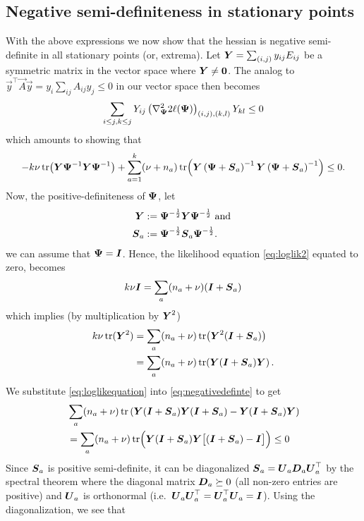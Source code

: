 \documentclass{article}\usepackage[]{graphicx}\usepackage[]{color}
\begin{document}
\subsection{Negative semi-definiteness in stationary points}
With the above expressions we now show that the hessian is negative semi-definite in all stationary points (or, extrema).
Let ${\boldsymbol{Y}} = \sum_{(i,j)} y_{ij}E_{ij}$ be a symmetric matrix in the vector space where ${\boldsymbol{Y}} \neq \boldsymbol{0}$. The analog to $\vec{y}^\top \vec{A}\vec{y} = y_i \sum_{ij} A_{ij} y_j \leq 0$ in our vector space then becomes
\begin{align*}
  \sum_{i\leq j, k\leq j}
    Y_{ij}
    \left(\nabla^2_{\boldsymbol{\Psi}} 2\ell({\boldsymbol{\Psi}})\right)_{(i,j),(k,l)}
    Y_{kl} \leq 0
\end{align*}
which amounts to showing that
\small
\begin{align}
- k\nu\operatorname*{tr}\!\left( {\boldsymbol{Y}}{\boldsymbol{\Psi}}^{-1} {\boldsymbol{Y}}{\boldsymbol{\Psi}}^{-1} \right)
+ \sum_{a = 1}^k (\nu + n_a)
    \operatorname*{tr}\!\left(
      {\boldsymbol{Y}}\left({\boldsymbol{\Psi}} + {\boldsymbol{S}}_a\right)^{-1}
      {\boldsymbol{Y}}\left({\boldsymbol{\Psi}} + {\boldsymbol{S}}_a\right)^{-1}
    \right) \leq 0.
  \label{eq:negativedefinte}
\end{align}
\normalsize
Now, the positive-definiteness of ${\boldsymbol{\Psi}}$, let
\begin{align*}
  {\boldsymbol{Y}} &:= {\boldsymbol{\Psi}}^{-\frac{1}{2}} {\boldsymbol{Y}} {\boldsymbol{\Psi}}^{-\frac{1}{2}} \text{ and } \\
  {\boldsymbol{S}}_a &:= {\boldsymbol{\Psi}}^{-\frac{1}{2}} {\boldsymbol{S}}_a  {\boldsymbol{\Psi}}^{-\frac{1}{2}}.
\end{align*}
we can assume that ${\boldsymbol{\Psi}} = {\boldsymbol{I}}$. Hence, the likelihood equation \eqref{eq:loglik2} equated to zero, becomes
\begin{align*}
  k\nu{\boldsymbol{I}} = \sum_a(n_a + \nu)({\boldsymbol{I}} + {\boldsymbol{S}}_a)
\end{align*}
which implies (by multiplication by ${\boldsymbol{Y}}^2$)
\begin{align}
  k\nu\operatorname*{tr}({\boldsymbol{Y}}^2)
  &= \sum_a (n_a + \nu)\operatorname*{tr}\!\left({\boldsymbol{Y}}^2({\boldsymbol{I}} + {\boldsymbol{S}}_a)\right) \notag\\
  &= \sum_a (n_a + \nu)\operatorname*{tr}\!\left({\boldsymbol{Y}}({\boldsymbol{I}} + {\boldsymbol{S}}_a){\boldsymbol{Y}}\right).
  \label{eq:loglikequation}
\end{align}
We substitute \eqref{eq:loglikequation} into \eqref{eq:negativedefinte} to get
\begin{align*}
  &\sum_a (n_a + \nu)\operatorname*{tr}\left({\boldsymbol{Y}} ({\boldsymbol{I}} + {\boldsymbol{S}}_a) {\boldsymbol{Y}} ({\boldsymbol{I}} + {\boldsymbol{S}}_a) - {\boldsymbol{Y}} ({\boldsymbol{I}} + {\boldsymbol{S}}_a) {\boldsymbol{Y}} \right) \\
  &=  \sum_a (n_a + \nu)\operatorname*{tr}\!\Big( {\boldsymbol{Y}} ({\boldsymbol{I}} + {\boldsymbol{S}}_a) {\boldsymbol{Y}} \big[ ({\boldsymbol{I}} + {\boldsymbol{S}}_a)  - {\boldsymbol{I}} \big]\Big)
  \leq 0
\end{align*}
Since ${\boldsymbol{S}}_a$ is positive semi-definite, it can be diagonalized ${\boldsymbol{S}}_a = {\boldsymbol{U}}_a {\boldsymbol{D}}_a {\boldsymbol{U}}_a^\top$ by the spectral theorem where the diagonal matrix ${\boldsymbol{D}}_a \succeq 0$ (all non-zero entries are positive) and ${\boldsymbol{U}}_a$ is orthonormal (i.e.\ ${\boldsymbol{U}}_a{\boldsymbol{U}}_a^\top = {\boldsymbol{U}}_a^\top{\boldsymbol{U}}_a = {\boldsymbol{I}}$). Using the diagonalization, we see that
\end{document}

